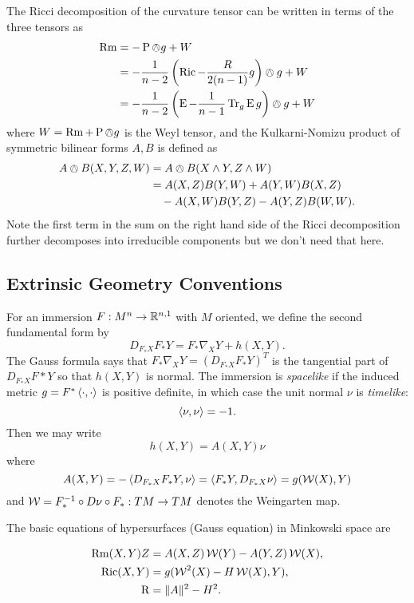 \documentclass[a4paper, 12pt]{amsart}
\begin{document}
The Ricci decomposition of the curvature tensor can be written in terms of the three tensors as
\begin{align*}
\operatorname{Rm} &= -\operatorname{P} \owedge g + W \\
&= -\frac{1}{n-2} \left(\operatorname{Ric} - \frac{R}{2(n-1)} g\right) \owedge g + W \\
&= -\frac{1}{n-2} \left(\operatorname{E}  -\frac{1}{n-1} \operatorname{Tr}_g \operatorname{E} g\right) \owedge g + W
\end{align*}
where \(W = \operatorname{Rm} + \operatorname{P} \owedge g\) is the Weyl tensor, and the Kulkarni-Nomizu product of symmetric bilinear forms \(A, B\) is defined as
\[
\begin{split}
A \owedge B (X, Y, Z, W) &= A \owedge B (X \wedge Y, Z \wedge W) \\
&= A(X, Z) B(Y, W) + A(Y, W) B(X, Z) \\
&\quad - A(X, W) B(Y, Z) - A(Y, Z) B(W, W).
\end{split}
\]
Note the first term in the sum on the right hand side of the Ricci decomposition further decomposes into irreducible components but we don't need that here.

\subsection{Extrinsic Geometry Conventions}
\label{subsec:notation_extrinsic}

For an immersion \(F : M^n \to \mathbb{R}^{n,1}\) with \(M\) oriented, we define the second fundamental form by
\[
D_{F_{\ast} X} F_{\ast} Y = F_{\ast} \nabla_X Y + h(X, Y).
\]
The Gauss formula says that \(F_{\ast} \nabla_X Y = (D_{F_{\ast} X} F_{\ast} Y)^T\) is the tangential part of \(D_{F_{\ast} X} F{\ast} Y\) so that \(h(X, Y)\) is normal. The immersion is \emph{spacelike} if the induced metric \(g = F^{\ast} \left\langle \cdot,\cdot \right\rangle\) is positive definite, in which case the unit normal \(\nu\) is \emph{timelike}:
\[
\left\langle \nu,\nu \right\rangle = -1.
\]
Then we may write
\[
h(X, Y) = A(X, Y) \nu
\]
where
\[
A(X, Y) = -\left\langle D_{F_{\ast} X} F_{\ast} Y,\nu \right\rangle = \left\langle F_{\ast} Y,D_{F_{\ast} X} \nu \right\rangle = g(\operatorname{\mathcal{W}}(X), Y)
\]
and \(\operatorname{\mathcal{W}} = F_{\ast}^{-1} \circ D\nu \circ F_{\ast}: TM \to TM\) denotes the Weingarten map.

The basic equations of hypersurfaces (Gauss equation) in Minkowski space are

\begin{equation}
\label{eq:gauss}
\begin{split}
\operatorname{Rm}(X, Y) Z &= A(X, Z) \operatorname{\mathcal{W}}(Y) - A(Y, Z) \operatorname{\mathcal{W}}(X), \\
\operatorname{Ric}(X, Y) &= g(\operatorname{\mathcal{W}}^2(X) - H \operatorname{\mathcal{W}}(X), Y), \\
\operatorname{R} &= \|A\|^2 - H^2.
\end{split}
\end{equation}
\end{document}
